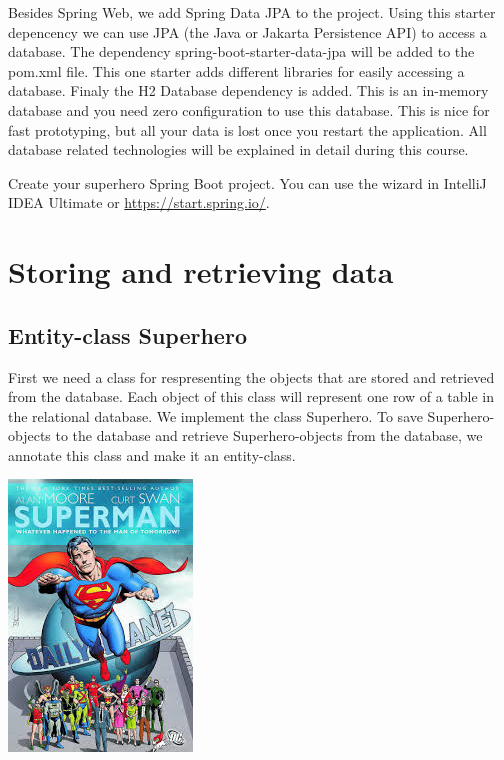 Besides Spring Web, we add Spring Data JPA to the project. Using this starter depencency we can use JPA (the Java or Jakarta Persistence API) to access a database. 
The dependency spring-boot-starter-data-jpa will be added to the pom.xml file. This one starter adds different libraries for easily accessing a database.
Finaly the H2 Database dependency is added. This is an in-memory database 
and you need zero configuration to use this database. This is nice for fast prototyping, but all your data is lost once you restart the application. All database related technologies will be explained in detail during this course. 

\begin{oefening}
Create your superhero Spring Boot project. You can use the wizard in IntelliJ IDEA Ultimate or \url{https://start.spring.io/}.
\end{oefening}

\section{Storing and retrieving data}

\subsection{Entity-class Superhero}

First we need a class for respresenting the objects that are stored and retrieved from the database. Each object of this class will represent one row of a table in the relational database.
We implement the class Superhero. To save Superhero-objects to the database and retrieve Superhero-objects from the database, we annotate this class and make it an entity-class. 

\includegraphics[scale=0.5]{./images/chapter2/superman.jpeg} 

